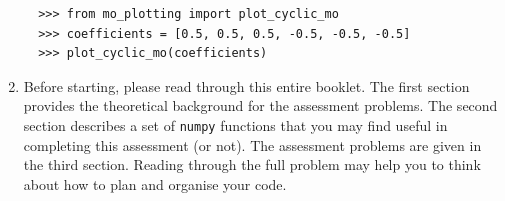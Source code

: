 \documentclass[a4paper]{article}
\begin{document}
\begin{enumerate}
\begin{figure}[h!]
  \centering
    \label{fig:linear_mo_example}
\end{figure}
\begin{lstlisting}
  >>> from mo_plotting import plot_cyclic_mo
  >>> coefficients = [0.5, 0.5, 0.5, -0.5, -0.5, -0.5]
  >>> plot_cyclic_mo(coefficients)
  \end{lstlisting}
\begin{figure}[h!]
  \centering
    \label{fig:cyclic_mo_example}
\end{figure}
  \item Before starting, please read through this entire booklet. The first section provides the theoretical background for the assessment problems. The second section describes a set of \texttt{numpy} functions that you may find useful in completing this assessment (or not). The assessment problems are given in the third section. Reading through the full problem may help you to think about how to plan and organise your code.

\end{enumerate}
\end{document}
